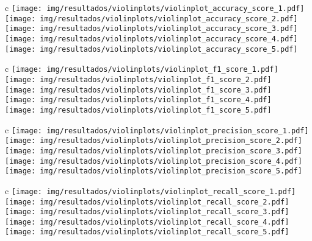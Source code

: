 \begin{longfigure}{c}
	\texttt{[image: img/resultados/violinplots/violinplot\_accuracy\_score\_1.pdf]} \\
	\texttt{[image: img/resultados/violinplots/violinplot\_accuracy\_score\_2.pdf]} \\
	\texttt{[image: img/resultados/violinplots/violinplot\_accuracy\_score\_3.pdf]} \\
	\texttt{[image: img/resultados/violinplots/violinplot\_accuracy\_score\_4.pdf]} \\
	\texttt{[image: img/resultados/violinplots/violinplot\_accuracy\_score\_5.pdf]} \\
	\caption{}
\end{longfigure}
	
\begin{longfigure}{c}
	\texttt{[image: img/resultados/violinplots/violinplot\_f1\_score\_1.pdf]} \\
	\texttt{[image: img/resultados/violinplots/violinplot\_f1\_score\_2.pdf]} \\
	\texttt{[image: img/resultados/violinplots/violinplot\_f1\_score\_3.pdf]} \\
	\texttt{[image: img/resultados/violinplots/violinplot\_f1\_score\_4.pdf]} \\
	\texttt{[image: img/resultados/violinplots/violinplot\_f1\_score\_5.pdf]} \\
	\caption{}
\end{longfigure}

\begin{longfigure}{c}
	\texttt{[image: img/resultados/violinplots/violinplot\_precision\_score\_1.pdf]} \\
	\texttt{[image: img/resultados/violinplots/violinplot\_precision\_score\_2.pdf]} \\
	\texttt{[image: img/resultados/violinplots/violinplot\_precision\_score\_3.pdf]} \\
	\texttt{[image: img/resultados/violinplots/violinplot\_precision\_score\_4.pdf]} \\
	\texttt{[image: img/resultados/violinplots/violinplot\_precision\_score\_5.pdf]} \\
	\caption{}
\end{longfigure}
	
\begin{longfigure}{c}
	\texttt{[image: img/resultados/violinplots/violinplot\_recall\_score\_1.pdf]} \\
	\texttt{[image: img/resultados/violinplots/violinplot\_recall\_score\_2.pdf]} \\
	\texttt{[image: img/resultados/violinplots/violinplot\_recall\_score\_3.pdf]} \\
	\texttt{[image: img/resultados/violinplots/violinplot\_recall\_score\_4.pdf]} \\
	\texttt{[image: img/resultados/violinplots/violinplot\_recall\_score\_5.pdf]} \\
	\caption{}
\end{longfigure}
